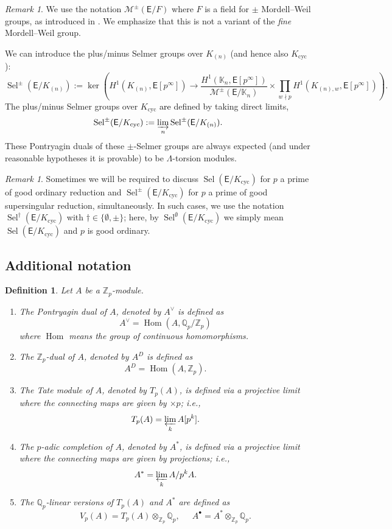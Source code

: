 \documentclass{amsart}
\newcommand{\edit}[1]{\textcolor{black}{#1}}
\newtheorem{definition}[theorem]{Definition}
\numberwithin{equation}{section}
\theoremstyle{remark}
\newtheorem{remark}[theorem]{Remark}
\newcommand{\EC}{\mathsf{E}}
\newcommand{\cM}{\mathcal{M}}
\newcommand{\Qp}{\mathbb{Q}_p}
\newcommand{\Kn}{\mathbb{K}_{n}}
\newcommand{\Zp}{\mathbb{Z}_p}
\newcommand{\cyc}{\operatorname{{cyc}}}
\newcommand{\Sel}{\operatorname{Sel}}
\theoremstyle{plain} %
\begin{document}
\begin{remark}
We use the notation $\cM^{\pm}(\EC/F)$ where $F$ is a field for $\pm$ Mordell--Weil groups, as introduced in \cite{Lei23}.
We emphasize that this is not a variant of the \emph{fine} Mordell--Weil group.
\end{remark}

We can introduce the plus/minus Selmer groups over $K_{(n)}$ (and hence also $K_{\cyc}$):
\[
\Sel^{\pm}(\EC/K_{(n)}) := \ker\left( H^1(K_{(n)}, \EC[p^\infty]) \longrightarrow \frac{H^1(\Kn, \EC[p^\infty])}{\cM^{\pm}(\EC/\Kn)} \times \prod_{w\nmid p} H^1(K_{(n),w}, \EC[p^\infty])\right).
\]
The plus/minus Selmer groups over $K_{\cyc}$ \edit{are} defined by taking direct limits,
\[
\Sel^{\pm}(\EC/K_{\cyc}) := \varinjlim_n \Sel^{\pm}(\EC/K_{(n)}).
\]
These Pontryagin dual\edit{s} of these $\pm$-Selmer groups are always expected (and under reasonable hypotheses it is provable) to be $\Lambda$-torsion modules.

\begin{remark}
Sometimes we will be required to discuss $\Sel(\EC/K_{\cyc})$ for $p$ a prime of good ordinary reduction and $\Sel^{\pm}(\EC/K_{\cyc})$ for $p$ a prime of good supersingular reduction, simultaneously.
In such cases, we use the notation $\Sel^{\dagger}(\EC/K_{\cyc})$ with $\dagger\in \{\emptyset, \pm \}$; here, by $\Sel^{\emptyset}(\EC/K_{\cyc})$ we simply mean $\Sel(\EC/K_{\cyc})$ and $p$ is good ordinary.
\end{remark}





\subsection{Additional notation}
\begin{definition}
\label{additional notation}
Let $A$ be a $\Zp$-module.
\begin{enumerate}
\item[\textup{(}i\textup{)}] The \emph{Pontryagin dual} of $A$, denoted by $A^\vee$ is defined as
\[
A^\vee = \operatorname{Hom}(A, \Qp/\Zp)
\]
where $\operatorname{Hom}$ means the group of continuous homomorphisms.
\item[\textup{(}ii\textup{)}] The $\Zp$-dual of $A$, denoted by $A^D$ is defined as
\[
A^D = \operatorname{Hom}(A, \Zp).
\]
\item[\textup{(}iii\textup{)}] The \emph{Tate module} of $A$, denoted by $T_p( A)$, is defined via a projective limit where the connecting maps are given by $\times p$; i.e.,
\[
T_p(A) = \varprojlim_k A[p^k].
\]
\item[\textup{(}iv\textup{)}] The \emph{$p$-adic completion} of $A$, denoted by $A^*$, is defined via a projective limit where the connecting maps are given by projections; i.e.,
\[
A^* = \varprojlim_k A/p^kA.
\]
\item[\textup{(}v\textup{)}] The $\Qp$-linear versions of $T_p( A)$ and $A^*$ are defined as
\[
V_p( A) = T_p( A) \otimes_{\Zp} \Qp, \ \quad \ A^{\bullet} = A^* \otimes_{\Zp} \Qp.
\]
\end{enumerate}
\end{definition}
\end{document}

